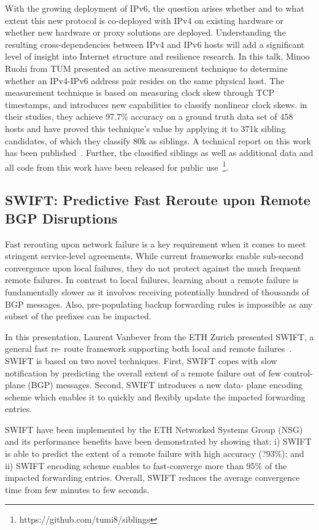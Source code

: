 With the growing deployment of IPv6, the question arises whether and to what extent this new protocol is co-deployed with IPv4 on existing hardware or whether new hardware or proxy solutions are deployed. Understanding the resulting cross-dependencies between IPv4 and IPv6 hosts will add a significant level of insight into Internet structure and resilience research. In this talk, Minoo Ruohi from TUM presented an active measurement technique to determine whether an IPv4-IPv6 address pair resides on the same physical host. The measurement technique is based on measuring clock skew through TCP timestamps, and introduces new capabilities to classify nonlinear clock skews. in their studies, they achieve 97.7\% accuracy on a ground truth data set of 458 hosts and have proved this technique's value by applying it to 371k sibling candidates, of which they classify 80k as siblings. A technical report on this work has been published~\cite{Scheitle2016}. Further, the classified siblings as well as additional data and all code from this work have been released for public use~\footnote{https://github.com/tumi8/siblings}.


\subsection{SWIFT: Predictive Fast Reroute upon Remote BGP Disruptions}

Fast rerouting upon network failure is a key requirement when it comes to meet stringent service-level agreements. While current frameworks enable sub-second convergence upon local failures, they do not protect against the much frequent remote failures. In contrast to local failures, learning about a remote failure is fundamentally slower as it involves receiving potentially hundred of thousands of BGP messages. Also, pre-populating backup forwarding rules is impossible as any subset of the prefixes can be impacted.

In this presentation, Laurent Vanbever from the ETH Zurich presented SWIFT, a general fast re- route framework supporting both local and remote failures~\cite{}. SWIFT is based on two novel techniques. First, SWIFT copes with slow notification by predicting the overall extent of a remote failure out of few control-plane (BGP) messages. Second, SWIFT introduces a new data- plane encoding scheme which enables it to quickly and flexibly update the impacted forwarding entries.

SWIFT have been implemented by the ETH Networked Systems Group (NSG) and its performance benefits have been demonstrated by showing that: i) SWIFT is able to predict the extent of a remote failure with high accuracy (?93\%); and ii) SWIFT encoding scheme enables to fast-converge more than 95\% of the impacted forwarding entries. Overall, SWIFT reduces the average convergence time from few minutes to few seconds.

